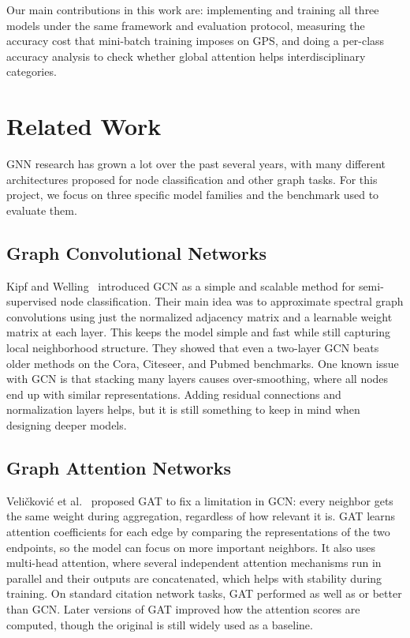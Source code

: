 \documentclass[conference]{IEEEtran}
\begin{document}
Our main contributions in this work are: implementing and training all three models under
the same framework and evaluation protocol, measuring the accuracy cost that mini-batch
training imposes on GPS, and doing a per-class accuracy analysis to check whether global
attention helps interdisciplinary categories.

\section{Related Work}

GNN research has grown a lot over the past several years, with many different architectures
proposed for node classification and other graph tasks. For this project, we focus on three
specific model families and the benchmark used to evaluate them.

\subsection{Graph Convolutional Networks}

Kipf and Welling~\cite{kipf2017} introduced GCN as a simple and scalable method for
semi-supervised node classification. Their main idea was to approximate spectral graph
convolutions using just the normalized adjacency matrix and a learnable weight matrix at
each layer. This keeps the model simple and fast while still capturing local neighborhood
structure. They showed that even a two-layer GCN beats older methods on the Cora, Citeseer,
and Pubmed benchmarks. One known issue with GCN is that stacking many layers causes
over-smoothing, where all nodes end up with similar representations. Adding residual
connections and normalization layers helps, but it is still something to keep in mind when
designing deeper models.

\subsection{Graph Attention Networks}

Veli\v{c}kovi\'{c} et al.~\cite{velickovic2018} proposed GAT to fix a limitation in GCN:
every neighbor gets the same weight during aggregation, regardless of how relevant it is.
GAT learns attention coefficients for each edge by comparing the representations of the
two endpoints, so the model can focus on more important neighbors. It also uses multi-head
attention, where several independent attention mechanisms run in parallel and their outputs
are concatenated, which helps with stability during training. On standard citation network
tasks, GAT performed as well as or better than GCN. Later versions of GAT improved how the
attention scores are computed, though the original is still widely used as a baseline.
\end{document}

